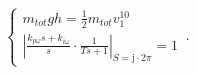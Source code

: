 \begin{equation}
    \begin{cases}
      m_{tot} g h = \frac{1}{2} m_{tot} v_1^ 10\\
      \left\lvert\frac{k_{p\omega}s+k_{i\omega}}{s}\cdot\frac{1}{Ts+1}\right\rvert_{S=\mathrm{j}\cdot2\pi}=1
    \end{cases}\,.
\end{equation}